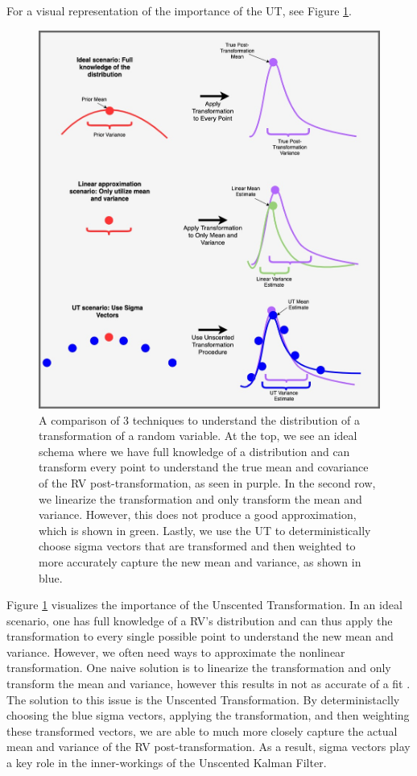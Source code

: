     For a visual representation of the importance of the UT, see Figure \ref{fig:UT_Diagram_Custom}.
    \begin{figure} [H]
    \centering
    \includegraphics[scale = .5]{Kalman_Filter_Images/Unscented_Transformation_Diagram.jpg}
    \caption{A comparison of 3 techniques to understand the distribution of a transformation of a random variable. At the top, we see an ideal schema where we have full knowledge of a distribution and can transform every point to understand the true mean and covariance of the RV post-transformation, as seen in purple. In the second row, we linearize the transformation and only transform the mean and variance. However, this does not produce a good approximation, which is shown in green. Lastly, we use the UT to deterministically choose sigma vectors that are transformed and then weighted to more accurately capture the new mean and variance, as shown in blue.}
    \label{fig:UT_Diagram_Custom}
    \end{figure}
    
    Figure \ref{fig:UT_Diagram_Custom} visualizes the importance of the Unscented Transformation. In an ideal scenario, one has full knowledge of a RV's distribution and can thus apply the transformation to every single possible point to understand the new mean and variance. However, we often need ways to approximate the nonlinear transformation. One naive solution is to linearize the transformation and only transform the mean and variance, however this results in not as accurate of a fit \cite{VanMereChapter}. The solution to this issue is the Unscented Transformation. By deterministaclly choosing the blue sigma vectors, applying the transformation, and then weighting these transformed vectors, we are able to much more closely capture the actual mean and variance of the RV post-transformation. As a result, sigma vectors play a key role in the inner-workings of the Unscented Kalman Filter.\\
    
